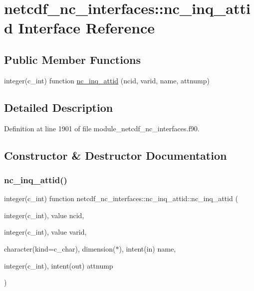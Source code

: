 \hypertarget{interfacenetcdf__nc__interfaces_1_1nc__inq__attid}{}\section{netcdf\+\_\+nc\+\_\+interfaces\+:\+:nc\+\_\+inq\+\_\+attid Interface Reference}
\label{interfacenetcdf__nc__interfaces_1_1nc__inq__attid}
\subsection*{Public Member Functions}
\begin{DoxyCompactItemize}
\item 
integer(c\+\_\+int) function \hyperlink{interfacenetcdf__nc__interfaces_1_1nc__inq__attid_a0c1e26c948fd48c92776c50f2b65d957}{nc\+\_\+inq\+\_\+attid} (ncid, varid, name, attnump)
\end{DoxyCompactItemize}


\subsection{Detailed Description}


Definition at line 1901 of file module\+\_\+netcdf\+\_\+nc\+\_\+interfaces.\+f90.



\subsection{Constructor \& Destructor Documentation}
\mbox{\label{interfacenetcdf__nc__interfaces_1_1nc__inq__attid_a0c1e26c948fd48c92776c50f2b65d957}} 
\subsubsection{\texorpdfstring{nc\+\_\+inq\+\_\+attid()}{nc\_inq\_attid()}}
{\footnotesize\ttfamily integer(c\+\_\+int) function netcdf\+\_\+nc\+\_\+interfaces\+::nc\+\_\+inq\+\_\+attid\+::nc\+\_\+inq\+\_\+attid (\begin{DoxyParamCaption}\item[{integer(c\+\_\+int), value}]{ncid,  }\item[{integer(c\+\_\+int), value}]{varid,  }\item[{character(kind=c\+\_\+char), dimension($\ast$), intent(in)}]{name,  }\item[{integer(c\+\_\+int), intent(out)}]{attnump }\end{DoxyParamCaption})}



